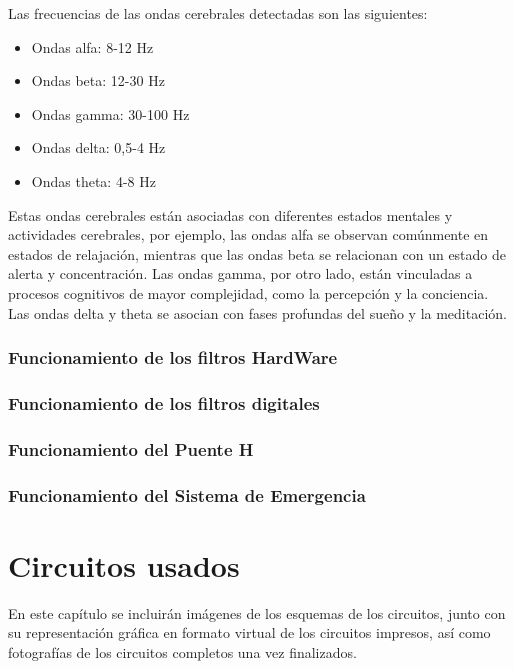 \documentclass{article}
\begin{document}
Las frecuencias de las ondas cerebrales detectadas son las siguientes:

\begin{itemize}
    \item Ondas alfa: 8-12 Hz
    \item Ondas beta: 12-30 Hz
    \item Ondas gamma: 30-100 Hz
    \item Ondas delta: 0,5-4 Hz
    \item Ondas theta: 4-8 Hz
\end{itemize}

Estas ondas cerebrales están asociadas con diferentes estados mentales y actividades cerebrales, por ejemplo, las ondas alfa se observan comúnmente en estados de relajación, mientras que las ondas beta se relacionan con un estado de alerta y concentración. Las ondas gamma, por otro lado, están vinculadas a procesos cognitivos de mayor complejidad, como la percepción y la conciencia. Las ondas delta y theta se asocian con fases profundas del sueño y la meditación.

\subsubsection{Funcionamiento de los filtros HardWare}



\subsubsection{Funcionamiento de los filtros digitales}


\subsubsection{Funcionamiento del Puente H}


\subsubsection{Funcionamiento del Sistema de Emergencia}



\section{Circuitos usados}
En este capítulo se incluirán imágenes de los esquemas de los circuitos, junto con su representación gráfica en formato virtual de los circuitos impresos, así como fotografías de los circuitos completos una vez finalizados.
\end{document}
